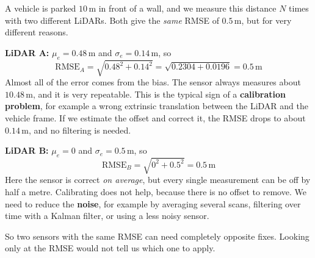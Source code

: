 \begin{examplebox}
A vehicle is parked $10\,\mathrm{m}$ in front of a wall, and we measure this distance $N$ times with two different LiDARs. Both give the \emph{same} RMSE of $0.5\,\mathrm{m}$, but for very different reasons.

\textbf{LiDAR A:} $\mu_e = 0.48\,\mathrm{m}$ and $\sigma_e = 0.14\,\mathrm{m}$, so
\[
\mathrm{RMSE}_A = \sqrt{0.48^2 + 0.14^2} = \sqrt{0.2304 + 0.0196} = 0.5\,\mathrm{m}
\]
Almost all of the error comes from the bias. The sensor always measures about $10.48\,\mathrm{m}$, and it is very repeatable. This is the typical sign of a \textbf{calibration problem}, for example a wrong extrinsic translation between the LiDAR and the vehicle frame. If we estimate the offset and correct it, the RMSE drops to about $0.14\,\mathrm{m}$, and no filtering is needed.

\textbf{LiDAR B:} $\mu_e = 0$ and $\sigma_e = 0.5\,\mathrm{m}$, so
\[
\mathrm{RMSE}_B = \sqrt{0^2 + 0.5^2} = 0.5\,\mathrm{m}
\]
Here the sensor is correct \emph{on average}, but every single measurement can be off by half a metre. Calibrating does not help, because there is no offset to remove. We need to reduce the \textbf{noise}, for example by averaging several scans, filtering over time with a Kalman filter, or using a less noisy sensor.

\begin{center}
\end{center}
So two sensors with the same RMSE can need completely opposite fixes. Looking only at the RMSE would not tell us which one to apply.
\end{examplebox}

